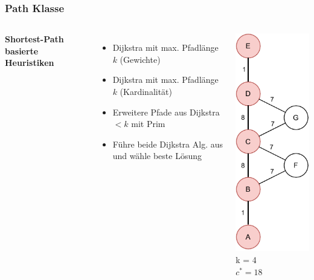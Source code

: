 \documentclass[aspectratio=169]{beamer}
\begin{document}
\begin{frame}
	\frametitle{Path Klasse}
	\begin{columns}[c] %
		
		\textbf{Shortest-Path basierte Heuristiken}
		\begin{itemize}
			\item Dijkstra mit max. Pfadlänge $k$ (Gewichte)
			\item Dijkstra mit max. Pfadlänge $k$ (Kardinalität)
			\item Erweitere Pfade aus Dijkstra $<k$ mit Prim
			\item Führe beide Dijkstra Alg. aus und wähle beste Lösung
		\end{itemize}
		\includegraphics[scale=.6]{path_optimal.pdf}
		k = 4\\
		$c^* = 18$
		
		
	\end{columns}
	\end{frame}
	
\end{document}
